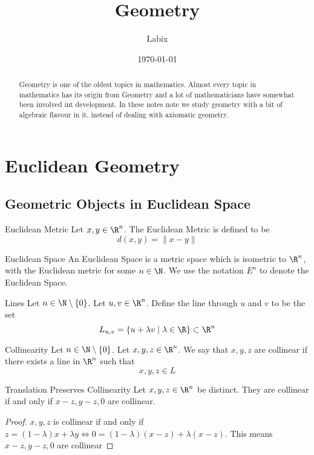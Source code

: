 \documentclass[a4paper]{article}
\title{Geometry}
\author{Labix}
\date{\today}
\begin{document}
\maketitle
\begin{abstract}
Geometry is one of the oldest topics in mathematics. Almost every topic in mathematics has its origin from Geometry and a lot of mathematicians have somewhat been involved int development. In these notes note we study geometry with a bit of algebraic flavour in it, instead of dealing with axiomatic geometry. 
\end{abstract}
\tableofcontents
\pagebreak
\section{Euclidean Geometry}
\subsection{Geometric Objects in Euclidean Space}
\begin{defn}{Euclidean Metric}{} Let $x,y\in \R^n$. The Euclidean Metric is defined to be $$d(x,y)=\|x-y\|$$
\end{defn}

\begin{defn}{Euclidean Space}{} An Euclidean Space is a metric space which is isometric to $\R^n$, with the Euclidean metric for some $n\in\N$. We use the notation $E^n$ to denote the Euclidean Space. 
\end{defn}

\begin{defn}{Lines}{} Let $n\in\N\setminus\{0\}$. Let $u,v\in\R^n$. Define the line through $u$ and $v$ to be the set $$L_{u,v}=\{u+\lambda v\;|\;\lambda\in\R\}\subset\R^n$$
\end{defn}

\begin{defn}{Collinearity}{} Let $n\in\N\setminus\{0\}$. Let $x,y,z\in\R^n$. We say that $x,y,z$ are collinear if there exists a line in $\R^n$ such that $$x,y,z\in L$$
\end{defn}

\begin{lmm}{Translation Preserves Collinearity}{} Let $x,y,z\in\R^n$ be distinct. They are collinear if and only if $x-z,y-z,0$ are collinear. \tcbline\begin{proof} $x,y,z$ is collinear if and only if $z=(1-\lambda)x+\lambda y\iff 0=(1-\lambda)(x-z)+\lambda(x-z)$. This means $x-z,y-z,0$ are collinear
\end{proof}
\end{lmm}
\end{document}
